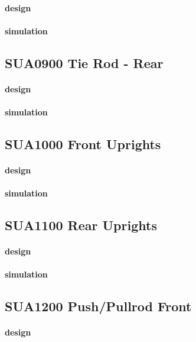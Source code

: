 		\paragraph{design} 
		\paragraph{simulation} 
	\subsection*{SU\textunderscore A0900 Tie Rod - Rear} 
 \par 
		\paragraph{design} 
		\paragraph{simulation} 
	\subsection*{SU\textunderscore A1000 Front Uprights} 
 \par 
		\paragraph{design} 
		\paragraph{simulation} 
	\subsection*{SU\textunderscore A1100 Rear Uprights} 
 \par 
		\paragraph{design} 
		\paragraph{simulation} 
	\subsection*{SU\textunderscore A1200 Push/Pullrod Front} 
 \par 
		\paragraph{design} 
